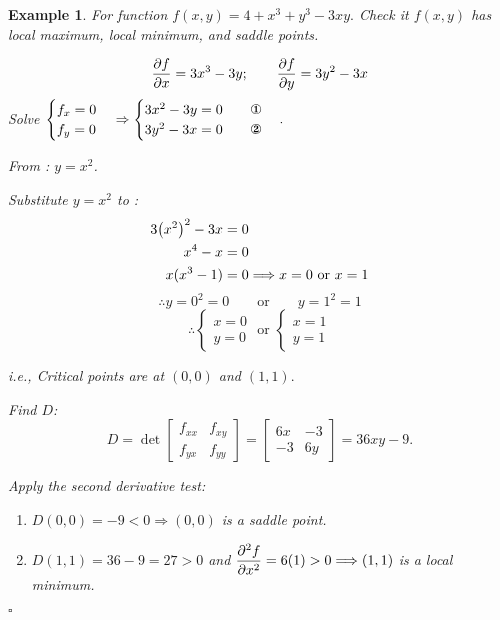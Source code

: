 \documentclass[12pt,a4paper]{article}
\newtheorem{eg}{Example}[subsection]
\newenvironment*{ans}{\par\indent{\textit{Answer. }}\par}{\par\hfill{$\square$}\par}
\begin{document}
\begin{eg}
	For function $f(x,y)=4+x^3+y^3-3xy.$ Check it $f(x,y)$ has local maximum, local minimum, and saddle points.
	\begin{ans}
		\[\pdv{f}{x}=3x^3-3y;\qquad\pdv{f}{y}=3y^2-3x\]
	Solve $\begin{cases}f_x=0\\f_y=0\end{cases}\Rightarrow\begin{cases}3x^2-3y=0\qquad\text{\ding{172}}\\3y^2-3x=0\qquad\text{\ding{173}}\end{cases}.$\par From : $y=x^2$.\par Substitute $y=x^2$ to : \[\begin{aligned}3\qty(x^2)^2-3x&=0\\x^4-x&=0\\x(x^3-1)&=0\Longrightarrow x=0\text{ or }x=1\end{aligned}\]\[\therefore y=0^2=0\qquad\text{or}\qquad y=1^2=1\]\[\therefore\begin{cases}x=0\\y=0\end{cases}\text{ or }\begin{cases}x=1\\y=1\end{cases}\]\par i.e., Critical points are at $(0,0)$ and $(1,1).$\par Find $D$: \[D=\det\begin{bmatrix}f_{xx}&f_{xy}\\f_{yx}&f_{yy}\end{bmatrix}=\begin{bmatrix}6x&-3\\-3&6y\end{bmatrix}=36xy-9.\]\par Apply the second derivative test: \begin{enumerate}
		\item $D(0,0)=-9<0\Longrightarrow(0,0)$ is a saddle point.
		\item $D(1,1)=36-9=27>0$ and $\displaystyle\pdv[2]{f}{x}(1,1)=6(1)>0\Longrightarrow(1,1)$ is a local minimum. \end{enumerate}
	\end{ans}
\end{eg}
\end{document}
